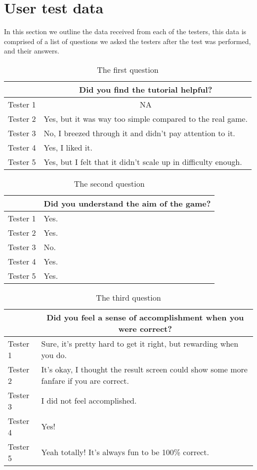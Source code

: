 \appendix\label{appendix}

\section{User test data}\label{sec.data}

In this section we outline the data received from each of the testers, this data is comprised of a list of questions we asked the testers after the test was performed, and their answers.

\begin{table}[H]
\centering
\caption{The first question}
\label{tab:question1}
\begin{tabular}{p{1.3cm}p{10cm}}
\toprule
 & \multicolumn{1}{c}{Did you find the tutorial helpful?} \\ \midrule
Tester 1 & \multicolumn{1}{c}{NA} \\
Tester 2 & Yes, but it was way too simple compared to the real game. \\
Tester 3 & No, I breezed through it and didn't pay attention to it. \\
Tester 4 & Yes, I liked it. \\
Tester 5 & Yes, but I felt that it didn't scale up in difficulty enough. \\ \bottomrule
\end{tabular}
\end{table}

\begin{table}[H]
\centering
\caption{The second question}
\label{tab:question2}
\begin{tabular}{p{1.3cm}p{10cm}}
\toprule
 & \multicolumn{1}{c}{Did you understand the aim of the game?} \\ \midrule
Tester 1 & Yes. \\
Tester 2 & Yes. \\
Tester 3 & No. \\
Tester 4 & Yes. \\
Tester 5 & Yes. \\ \bottomrule
\end{tabular}
\end{table}

\begin{table}[H]
\centering
\caption{The third question}
\label{tab:question3}
\begin{tabular}{p{1.3cm}p{10cm}}
\toprule
 & \multicolumn{1}{c}{Did you feel a sense of accomplishment when you were correct?} \\ \midrule
Tester 1 & Sure, it's pretty hard to get it right, but rewarding when you do. \\
Tester 2 & It's okay, I thought the result screen could show some more fanfare if you are correct. \\
Tester 3 & I did not feel accomplished. \\
Tester 4 & Yes! \\
Tester 5 & Yeah totally! It's always fun to be 100\% correct. \\ \bottomrule
\end{tabular}
\end{table}

